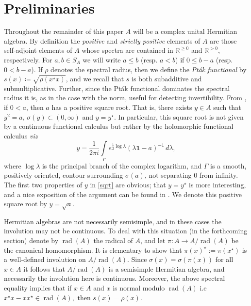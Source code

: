\documentclass{amsart}
\theoremstyle{definition}
\theoremstyle{remark}
\DeclareMathOperator{\rad}{rad} \DeclareMathOperator{\G}{G}
\newcommand{\identity}{\mathbf{1}}
\begin{document}
	\section{Preliminaries} 
	
 Throughout the remainder of this paper $A$ will be a complex unital Hermitian algebra. By definition the \emph{positive} and \emph{strictly positive} elements of $A$ are those self-adjoint elements of $A$ whose spectra are contained in $\mathbb{R}^{\geq 0}$ and $\mathbb{R}^{>0}$, respectively. For $a,b\in S_A$ we will write $a\leq b$ (resp. $a<b$) if $0\leq b-a$ (resp. $0<b-a$). If $\rho$ denotes the spectral radius, then we define the \emph{Pt\'ak functional} by $s(x)\coloneqq \sqrt{\rho(x^\star x)}$, and we recall that $s$ is both subadditive and submultiplicative. Further, since the Pt\'ak functional dominates the spectral radius it is, as in the case with the norm, useful for detecting invertibility. From \cite[Theorem 11.20]{Rudin}, if $0<a$, then $a$ has a positive square root. That is, there exists $y\in A$ such that $y^2=a$, $\sigma(y)\subset(0,\infty)$ and $y=y^\star$. In particular, this square root is not given by a continuous functional calculus but rather by the holomorphic functional calculus \emph{viz}
 \begin{equation}\label{sqrt}
	y=\frac{1}{2\pi i}\int\limits_\Gamma e^{\frac{1}{2}\log\lambda}\left(\lambda\identity-a\right)^{-1}\,d\lambda,
\end{equation}
	 where $\log\lambda $ is the principal branch of the complex logarithm, and $\Gamma$ is a smooth, positively oriented, contour surrounding $\sigma(a)$, not separating $0$ from infinity. The first two properties of $y$ in \eqref{sqrt} are obvious; that $y=y^\star$ is more interesting, and a nice exposition of the argument can be found in \cite{Rudin}. 
	 We denote this positive square root by $y=\sqrt a$.
	 
	   Hermitian algebras are not necessarily semisimple, and in these cases the involution may not be continuous. To deal with this situation (in the forthcoming section) denote by $\rad(A)$ the radical of $A$, and let $\pi:A\to A/\rad(A)$ be the canonical homomorphism. It is elementary to show that $\pi(x)^\star:=\pi(x^\star)$ is a well-defined
	involution on $A/\rad(A)$. Since $\sigma(x)=\sigma(\pi(x))$ for all $x\in A$ it follows that $A/\rad(A)$ is a semisimple Hermitian algebra, and necessarily the involution here is continuous. Moreover, the above spectral equality implies that if $x\in A$ and $x$ is normal modulo $\rad(A)$ i.e $x^\star x-xx^\star\in\rad(A),$ then $s(x)=\rho(x).$ 
	
\end{document}
